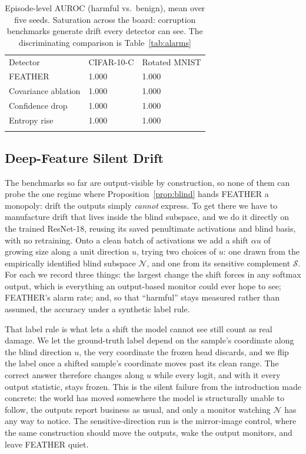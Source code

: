 \documentclass[graybox]{SNmult}
\begin{document}
\begin{table}[!t]
\caption{Episode-level AUROC (harmful vs.\ benign), mean over five seeds.
Saturation across the board: corruption benchmarks generate drift every
detector can see. The discriminating comparison is Table~\ref{tab:alarms}}
\label{tab:auroc}
\begin{tabular}{p{4.2cm}p{2.6cm}p{2.6cm}}
\hline\noalign{\smallskip}
Detector & CIFAR-10-C & Rotated MNIST \\
\noalign{\smallskip}\svhline\noalign{\smallskip}
FEATHER & 1.000 & 1.000 \\
Covariance ablation & 1.000 & 1.000 \\
Confidence drop & 1.000 & 1.000 \\
Entropy rise & 1.000 & 1.000 \\
\noalign{\smallskip}\hline\noalign{\smallskip}
\end{tabular}
\end{table}

\subsection{Deep-Feature Silent Drift}
\label{sec:blinddeep}

The benchmarks so far are output-visible by construction, so none of them can
probe the one regime where Proposition~\ref{prop:blind} hands FEATHER a
monopoly: drift the outputs simply \emph{cannot} express. To get there we have
to manufacture drift that lives inside the blind subspace, and we do it
directly on the trained ResNet-18, reusing its saved penultimate activations
and blind basis, with no retraining. Onto a clean batch of activations we add
a shift $\alpha u$ of growing size along a unit direction $u$, trying two
choices of $u$: one drawn from the empirically identified blind subspace
$\mathcal{N}$, and one from its sensitive complement $\mathcal{S}$. For each we
record three things: the largest change the shift forces in any softmax
output, which is everything an output-based monitor could ever hope to see;
FEATHER's alarm rate; and, so that ``harmful'' stays measured rather than
assumed, the accuracy under a synthetic label rule.

That label rule is what lets a shift the model cannot see still count as real
damage. We let the ground-truth label depend on the sample's coordinate along
the blind direction $u$, the very coordinate the frozen head discards, and we
flip the label once a shifted sample's coordinate moves past its clean range.
The correct answer therefore changes along $u$ while every logit, and with it
every output statistic, stays frozen. This is the silent failure from the
introduction made concrete: the world has moved somewhere the model is
structurally unable to follow, the outputs report business as usual, and only
a monitor watching $\mathcal{N}$ has any way to notice. The
sensitive-direction run is the mirror-image control, where the same
construction should move the outputs, wake the output monitors, and leave
FEATHER quiet.
\end{document}
